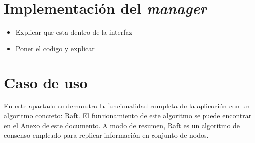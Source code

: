 \section{Implementación del \textit{manager}}

\begin{itemize}
\item Explicar que esta dentro de la interfaz
\item Poner el codigo y explicar
\end{itemize}

\section{Caso de uso}

En este apartado se demuestra la funcionalidad completa de la aplicación con un algoritmo concreto: Raft. El funcionamiento de este algoritmo se puede encontrar en el Anexo de este documento. A modo de resumen, Raft es un algoritmo de consenso empleado para replicar información en conjunto de nodos.


